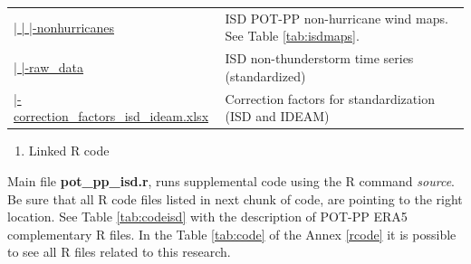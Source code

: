 \documentclass[12pt,oneside]{reedthesis}
\providecommand{\tightlist}{%
  \setlength{\itemsep}{0pt}\setlength{\parskip}{0pt}}
\begin{document}
\begin{longtable}[t]{>{\raggedright\arraybackslash}p{2.2in}>{\raggedright\arraybackslash}p{4in}}
\href{ftp://ftp.geocorp.co/windthesis/potpp/isd/maps/nonhurricanes/}{  |    |    |-nonhurricanes} & ISD POT-PP non-hurricane wind maps. See Table \ref{tab:isdmaps}.\\
\href{ftp://ftp.geocorp.co/windthesis/potpp/isd/raw_data/}{  |    |-raw\_data} & ISD non-thunderstorm time series (standardized)\\
\href{ftp://ftp.geocorp.co/windthesis/potpp/correction_factors_isd_ideam.xlsx}{  |-correction\_factors\_isd\_ideam.xlsx} & Correction factors for standardization (ISD and IDEAM)\\
\bottomrule
\end{longtable}
\endgroup{}
\begin{enumerate}
\def\labelenumi{\arabic{enumi}.}
\setcounter{enumi}{3}
\tightlist
\item
  Linked R code
\end{enumerate}
Main file \textbf{pot\_pp\_isd.r}, runs supplemental code using the R command \emph{source}. Be sure that all R code files listed in next chunk of code, are pointing to the right location. See Table \ref{tab:codeisd} with the description of POT-PP ERA5 complementary R files. In the Table \ref{tab:code} of the Annex \ref{rcode} it is possible to see all R files related to this research.

\scriptsize
\end{document}
